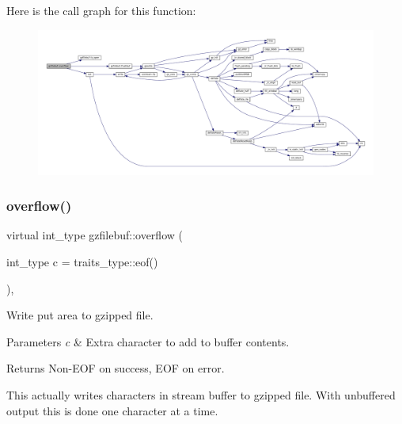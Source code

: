 Here is the call graph for this function\+:
\nopagebreak
\begin{figure}[H]
\begin{center}
\leavevmode
\includegraphics[width=350pt]{classgzfilebuf_a7a10ee573ebe6777c8a64e316569f694_cgraph}
\end{center}
\end{figure}
\mbox{\label{classgzfilebuf_a118cfb494fca6d5ce4d08447ea1fff2b}} 
\subsubsection{\texorpdfstring{overflow()}{overflow()}\hspace{0.1cm}{\footnotesize\ttfamily [2/2]}}
{\footnotesize\ttfamily virtual int\+\_\+type gzfilebuf\+::overflow (\begin{DoxyParamCaption}\item[{int\+\_\+type}]{c = {\ttfamily traits\+\_\+type\+:\+:eof()} }\end{DoxyParamCaption})\hspace{0.3cm}{\ttfamily [protected]}, {\ttfamily [virtual]}}



Write put area to gzipped file. 


\begin{DoxyParams}{Parameters}
{\em c} & Extra character to add to buffer contents. \\
\hline
\end{DoxyParams}
\begin{DoxyReturn}{Returns}
Non-\/\+E\+OF on success, E\+OF on error.
\end{DoxyReturn}
This actually writes characters in stream buffer to gzipped file. With unbuffered output this is done one character at a time. \mbox{\label{classgzfilebuf_a0ab89070031cbc37679365582180ae3c}} 
